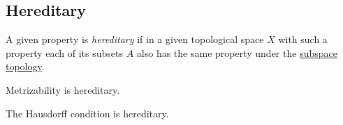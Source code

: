 \subsection{Hereditary}\label{hereditary}

A given property is \emph{hereditary} if in a given topological space $X$ with such a property each of its subsets $A$ also has the same property under the \hyperref[subspacetopology]{subspace topology}.

\begin{proposition}
Metrizability is hereditary.
\end{proposition}

\begin{proposition}
The Hausdorff condition is hereditary.
\end{proposition}
